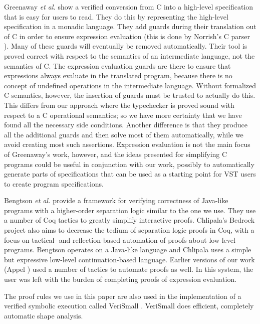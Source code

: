 \documentclass{puthesis}
\begin{document}
Greenaway \emph{et al.} \cite{greenaway12} show a verified conversion from C
into a high-level specification that is easy for users to read. They do this
by representing the high-level specification in a monadic language.
They add guards during their translation out of C in order to ensure
expression evaluation (this is done by Norrish's C parser
\cite{norrish:parser}). Many of these guards will eventually be removed
automatically. Their tool is proved correct with respect to the semantics of an
intermediate language, not the semantics of C. The expression evaluation guards are there
to ensure that expressions always evaluate in the translated program, because
there is no concept of undefined operations in the intermediate language.
Without formalized C semantics, however, the insertion of guards must be
trusted to actually do this. This differs from our approach where the
typechecker is proved sound with respect to a C operational semantics;
so we have more certainty that we have found all the necessary side conditions.
Another difference is that they produce all the additional guards and then
solve most of them automatically,  while we avoid creating
most such assertions. Expression evaluation
is not the main focus of Greenaway's work, however, and the ideas presented for
simplifying C programs could be useful in conjunction with our work,
possibly to automatically generate parts of specifications that can be
used as a starting point for VST users to create program
specifications.

Bengtson \emph{et al.} \cite{bengtson12} provide a framework for verifying
correctness of Java-like programs with a higher-order separation logic similar
to the one we use. They use a number of Coq tactics to greatly simplify
interactive proofs. Chlipala's Bedrock project
\cite{chlipala11:pldi} also aims to decrease the tedium of separation logic
proofs in Coq, with a focus on tactical- and reflection-based 
automation of proofs about low level programs. Bengtson operates on a Java-like
language and Chlipala uses a simple but expressive low-level
continuation-based language.
Earlier versions of our
work (Appel \cite{appel06}) used a number of
tactics to automate proofs as well. In this system, the user was left with the
burden of completing proofs of expression evaluation.

The proof rules we use in this paper are also used in the implementation of a
verified symbolic execution called VeriSmall \cite{appel11:verismall}. 
VeriSmall does efficient, completely automatic 
shape analysis.  
\end{document}
